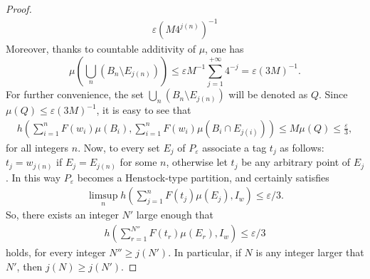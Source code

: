 \documentclass[11pt,a4paper,twoside]{amsart}
\begin{document}
\begin{proof}
\begin{eqnarray}
\varepsilon (M 4^{j(n)})^{-1}
\end{eqnarray}
Moreover, thanks to countable additivity of $\mu$, one has
$$\mu\left(\bigcup_n(B_n\setminus E_{j(n)})\right)\leq {\varepsilon} M^{-1}\sum_{j=1}^{+\infty}4^{-j}={\varepsilon}(3M)^{-1}.$$
For further convenience, the set $\bigcup_n(B_n\setminus E_{j(n)})$ will be denoted as $Q$. Since $\mu(Q)\leq {\varepsilon}(3M)^{-1}$, it is easy to see that 
\begin{eqnarray}\label{Bridotta}
h\left(\sum_{i=1}^n F(w_i)\mu(B_i),\sum_{i=1}^n F(w_i)\mu(B_i\cap E_{j(i)})\right)\leq M\mu(Q)\leq \frac{\varepsilon}{3}, \end{eqnarray} for all integers $n$.
Now, to  every set $E_j$ of $P_{\varepsilon}$ associate a tag $t_j$ as follows: $t_j=w_{j(n)}$ if $E_j=E_{j(n)}$ for some $n$, otherwise let $t_j$ be any arbitrary point of $E_j$. In this way $P_{\varepsilon}$ becomes a Henstock-type partition, and certainly satisfies
\begin{eqnarray}\label{wb2}
 \limsup_n h\left(\sum_{j=1}^nF(t_j)\mu(E_j),I_w\right)\leq {\varepsilon}/3.
\end{eqnarray}
So, there exists an integer $N'$ large enough that
\begin{eqnarray}\label{birkhoff}
h\left(\sum_{r=1}^{N''}F(t_r)\mu(E_r),I_w\right)\leq {\varepsilon}/3
\end{eqnarray}
holds, for every integer $N''\geq j(N')$. In particular, if $N$ is any integer larger that $N'$, then $j(N)\geq j(N')$.


\end{proof}
\end{document}

